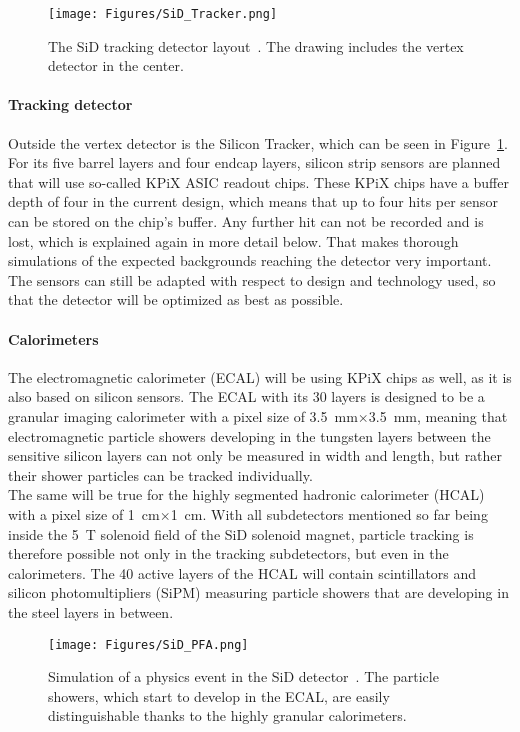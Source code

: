 \begin{figure}[h!]
\centering
\texttt{[image: Figures/SiD\_Tracker.png]}
\caption[Drawing of the SiD tracking detector]{The SiD tracking detector layout~\cite{SiD_Update2}.
The drawing includes the vertex detector in the center.}
\label{fig:SiD_tracker}
\end{figure}

\paragraph{Tracking detector}
Outside the vertex detector is the Silicon Tracker, which can be seen in Figure~\ref{fig:SiD_tracker}.
For its five barrel layers and four endcap layers, silicon strip sensors are planned that will use so-called KPiX ASIC readout chips.
These KPiX chips have a buffer depth of four in the current design, which means that up to four hits per sensor can be stored on the chip's buffer.
Any further hit can not be recorded and is lost, which is explained again in more detail below.
That makes thorough simulations of the expected backgrounds reaching the detector very important.
The sensors can still be adapted with respect to design and technology used, so that the detector will be optimized as best as possible.

\paragraph{Calorimeters}
The electromagnetic calorimeter (ECAL) will be using KPiX chips as well, as it is also based on silicon sensors.
The ECAL with its 30 layers is designed to be a granular imaging calorimeter with a pixel size of \SI{3.5}{\milli\meter}$\times$\SI{3.5}{\milli\meter}, meaning that electromagnetic particle showers developing in the tungsten layers between the sensitive silicon layers can not only be measured in width and length, but rather their shower particles can be tracked individually.
\\The same will be true for the highly segmented hadronic calorimeter (HCAL) with a pixel size of \SI{1}{\centi\meter}$\times$\SI{1}{\centi\meter}.
With all subdetectors mentioned so far being inside the \SI{5}{\tesla} solenoid field of the SiD solenoid magnet, particle tracking is therefore possible not only in the tracking subdetectors, but even in the calorimeters.
The 40 active layers of the HCAL will contain scintillators and silicon photomultipliers (SiPM) measuring particle showers that are developing in the steel layers in between.
\begin{figure}[h!]
\centering
\texttt{[image: Figures/SiD\_PFA.png]}
\caption[Visualization of the granulat SiD subdetectors]{Simulation of a physics event in the SiD detector~\cite{SiD_Update2}.
The particle showers, which start to develop in the ECAL, are easily distinguishable thanks to the highly granular calorimeters.}
\label{fig:SiD_PFA}
\end{figure}

